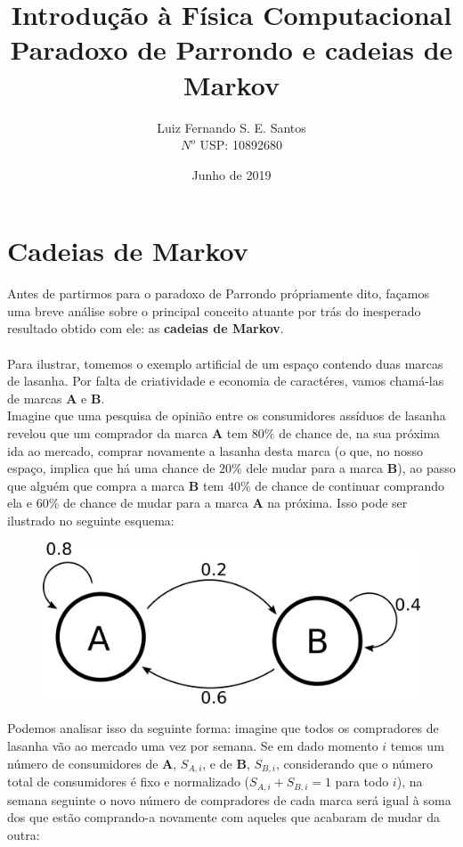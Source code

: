 \documentclass[12pt]{article}
\title{Introdução à Física Computacional\\Paradoxo de Parrondo e cadeias de Markov}
\author{Luiz Fernando S. E. Santos\\$N^o$ USP: 10892680 }
\date{Junho de 2019}
\begin{document}
\maketitle
\pagebreak

\section{Cadeias de Markov}

Antes de partirmos para o paradoxo de Parrondo própriamente dito, façamos uma breve análise sobre o principal conceito atuante por trás do inesperado resultado obtido com ele: as \textbf{cadeias de Markov}.\\
\\
Para ilustrar, tomemos o exemplo artificial de um espaço contendo duas marcas de lasanha. Por falta de criatividade e economia de caractéres, vamos chamá-las de marcas \textbf{A} e \textbf{B}.\\
Imagine que uma pesquisa de opinião entre os consumidores assíduos de lasanha revelou que um comprador da marca \textbf{A} tem $80\%$ de chance de, na sua próxima ida ao mercado, comprar novamente a lasanha desta marca (o que, no nosso espaço, implica que há uma chance de $20\%$ dele mudar para a marca \textbf{B}), ao passo que alguém que compra a marca \textbf{B} tem $40\%$ de chance de continuar comprando ela e $60\%$ de chance de mudar para a marca \textbf{A} na próxima. Isso pode ser ilustrado no seguinte esquema:\\

\begin{figure}[H]
\centering
\includegraphics[scale=0.7]{fig1.png}
\end{figure}

Podemos analisar isso da seguinte forma: imagine que todos os compradores de lasanha vão ao mercado uma vez por semana. Se em dado momento $i$ temos um número de consumidores de \textbf{A}, $S_{A, i}$, e de \textbf{B}, $S_{B, i}$, considerando que o número total de consumidores é fixo e normalizado ($S_{A, i} + S_{B, i} = 1$ para todo $i$), na semana seguinte o novo número de compradores de cada marca será igual à soma dos que estão comprando-a novamente com aqueles que acabaram de mudar da outra:
\end{document}
